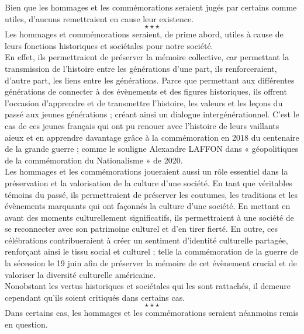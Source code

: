 \hspace*{0.5cm}Bien que les hommages et les commémorations seraient jugés par certains comme utiles, d'aucuns remettraient en cause leur existence.
$$\star \star \star$$
\hspace*{0.5cm}Les hommages et commémorations seraient, de prime abord, utiles à cause de leurs fonctions historiques et sociétales pour notre société.\\
\hspace*{0.5cm}En effet, ils permettraient de préserver la mémoire collective, car permettant la transmission de l’histoire entre les générations d’une part, ils renforceraient, d’autre part, les liens entre les générations. Parce que permettant aux différentes générations de connecter à des évènements et des figures historiques, ils offrent l’occasion d’apprendre et de transmettre l’histoire, les valeurs et les leçons du passé aux jeunes générations ; créant ainsi un dialogue intergénérationnel. C’est le cas de ces jeunes français qui ont pu renouer avec l’histoire de leurs vaillants aïeux et en apprendre davantage grâce à la commémoration en 2018 du centenaire de la grande guerre ; comme le souligne Alexandre LAFFON dans « géopolitiques de la commémoration du Nationalisme » de 2020.\\
\hspace*{0.5cm}Les hommages et les commémorations joueraient aussi un rôle essentiel dans la préservation et la valorisation de la culture d’une société. En tant que véritables témoins du passé, ils permettraient de préserver les coutumes, les traditions et les évènements marquants qui ont façonnés la culture d’une société. En mettant en avant des moments culturellement significatifs, ils permettraient à une société de se reconnecter avec son patrimoine culturel et d’en tirer fierté. En outre, ces célébrations contribueraient à créer un sentiment d’identité culturelle partagée, renforçant ainsi le tissu social et culturel ; telle la commémoration de la guerre de la sécession le 19 juin afin de préserver la mémoire de cet évènement crucial et de valoriser la diversité culturelle américaine. \\
\hspace*{0.5cm}Nonobstant les vertus historiques et sociétales qui les sont rattachés, il demeure cependant qu’ils soient critiqués dans certains cas.
$$\star \star \star$$
\hspace*{0.5cm}Dans certains cas, les hommages et les commémorations seraient néanmoins remis en question.\\
